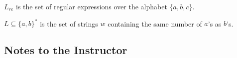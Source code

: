 \begin{prb}
$L_{re}$ is the set of regular expressions over the alphabet $\{a,b,c\}$.
\end{prb}

\begin{prb}
$L\subseteq \{a,b\}^*$ is the set of strings $w$ containing the same number of $a$'s as $b$'s.
\end{prb}


\backmatter

\begin{annotation}
\chapter{Notes to the Instructor}

\renewcommand\notesname{}
\vspace{-2cm}
\begingroup
\setlength{\parskip}{2ex}
\renewcommand{\enotesize}{\normalsize}
\theendnotes
\endgroup
\end{annotation}

\vspace{.1in}





